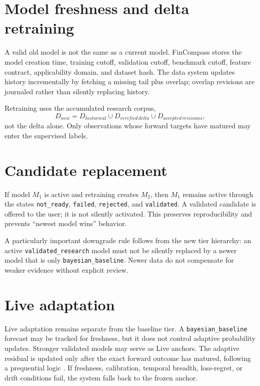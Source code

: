 \documentclass[11pt]{article}
\begin{document}
\section{Model freshness and delta retraining}
A valid old model is not the same as a current model. FinCompass stores the model creation time, training cutoff, validation cutoff, benchmark cutoff, feature contract, applicability domain, and dataset hash. The data system updates history incrementally by fetching a missing tail plus overlap; overlap revisions are journaled rather than silently replacing history.

Retraining uses the accumulated research corpus,
\begin{equation}
D_{new}=D_{historical}\cup D_{verified\,delta}\cup D_{accepted\,revisions},
\end{equation}
not the delta alone. Only observations whose forward targets have matured may enter the supervised labels.

\section{Candidate replacement}
If model $M_1$ is active and retraining creates $M_2$, then $M_1$ remains active through the states \texttt{not\_ready}, \texttt{failed}, \texttt{rejected}, and \texttt{validated}. A validated candidate is offered to the user; it is not silently activated. This preserves reproducibility and prevents ``newest model wins'' behavior.

A particularly important downgrade rule follows from the new tier hierarchy: an active \texttt{validated\_research} model must not be silently replaced by a newer model that is only \texttt{bayesian\_baseline}. Newer data do not compensate for weaker evidence without explicit review.

\section{Live adaptation}
Live adaptation remains separate from the baseline tier. A \texttt{bayesian\_baseline} forecast may be tracked for freshness, but it does not control adaptive probability updates. Stronger validated models may serve as Live anchors. The adaptive residual is updated only after the exact forward outcome has matured, following a prequential logic \citep{dawid1984prequential}. If freshness, calibration, temporal breadth, loss-regret, or drift conditions fail, the system falls back to the frozen anchor.
\end{document}
